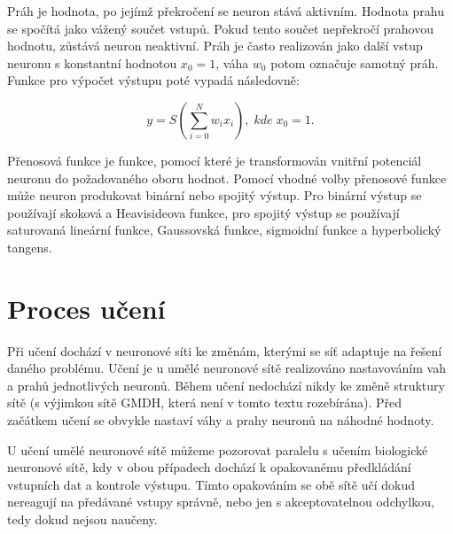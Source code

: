 \documentclass[11pt,twoside,a4paper]{book}
\begin{document}
Práh je hodnota, po jejímž překročení se neuron stává aktivním. Hodnota prahu se spočítá jako vážený součet vstupů. Pokud tento součet nepřekročí prahovou hodnotu, zůstává neuron neaktivní. Práh je často realizován jako další vstup neuronu s konstantní hodnotou \begin{math} x_{0}=1\end{math}, váha \begin{math} w_{0}\end{math} potom označuje samotný práh. Funkce pro výpočet výstupu poté vypadá následovně:

\begin{equation}
  y=S(\sum\limits_{i=0}^N w_{i}x_{i}),\; kde\; x_{0}=1\mbox{.}
\end{equation}

Přenosová funkce je funkce, pomocí které je transformován vnitřní potenciál neuronu do požadovaného oboru hodnot. Pomocí vhodné volby přenosové funkce může neuron produkovat binární nebo spojitý výstup. Pro binární výstup se používají skoková a Heavisideova funkce, pro spojitý výstup se používají saturovaná lineární funkce, Gaussovská funkce, sigmoidní funkce a hyperbolický tangens.\citep{teoret}

\section{Proces učení}
Při učení dochází v neuronové síti ke změnám, kterými se síť adaptuje na řešení daného problému. Učení je u umělé neuronové sítě realizováno nastavováním vah a prahů jednotlivých neuronů. Během učení nedochází nikdy ke změně struktury sítě (s výjimkou sítě GMDH, která není v tomto textu rozebírána). Před začátkem učení se obvykle nastaví váhy a prahy neuronů na náhodné hodnoty.

U učení umělé neuronové sítě můžeme pozorovat paralelu s učením biologické neuronové sítě, kdy v obou případech dochází k opakovanému předkládání vstupních dat a kontrole výstupu. Tímto opakováním se obě sítě učí dokud nereagují na předávané vstupy správně, nebo jen s akceptovatelnou odchylkou, tedy dokud nejsou naučeny.
\end{document}
